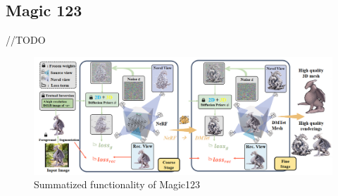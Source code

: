 \subsection{Magic 123}\label{Magic123}

//TODO

\begin{figure}[h]
    \centering
      \includegraphics[width=1\columnwidth]{figures/Magic123.png}
      \caption{Summatized functionality of Magic123}\label{fig:figureMagic123}
\end{figure}